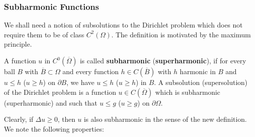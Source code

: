 \subsubsection{Subharmonic Functions}\label{subsec:subharmonic-functions}

We shall need a notion of subsolutions to the Dirichlet problem which does not require them to be of class $C^2(\Omega)$. The definition is motivated by the maximum principle.

\begin{Definition}
\label{def:continuous-subharmonic-function}
A function $u$ in $C^0(\overline\Omega)$ is called \textbf{subharmonic} (\textbf{superharmonic}), if for every ball $B$ with $\overline B\subset\Omega$ and every function $h\in C(\overline B)$ with $h$ harmonic in $B$ and $u\leq h$ ($u\geq h$) on $\partial B$, we have $u\leq h$ ($u\geq h$) in $B$. A subsolution (supersolution) of the Dirichlet problem is a function $u\in C(\overline\Omega)$ which is subharmonic (superharmonic) and such that $u\leq g$ ($u\geq g$) on $\partial\Omega$.
\end{Definition}

Clearly, if $\Delta u\geq0$, then $u$ is also subharmonic in the sense of the new definition. We note the following properties:

